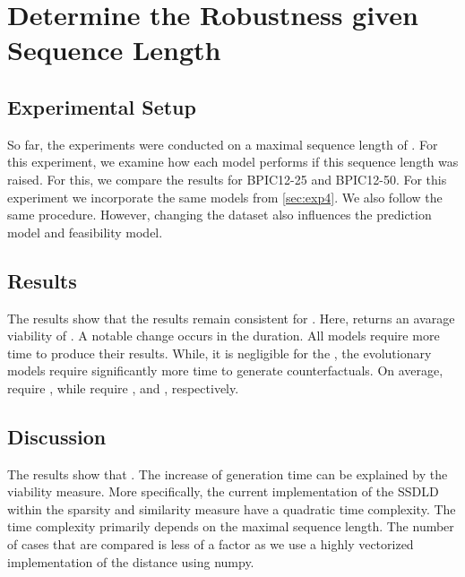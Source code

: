 \documentclass[./../../paper.tex]{subfiles}
\begin{document}
\section{Determine the Robustness given Sequence Length}

\subsection{Experimental Setup}
So far, the experiments were conducted on a maximal sequence length of . For this experiment, we examine how each model performs if this sequence length was raised. For this, we compare the results for BPIC12-25 and BPIC12-50. For this experiment we incorporate the same models from \autoref{sec:exp4}. We also follow the same procedure. However, changing the dataset also influences the prediction model and feasibility model.

\subsection{Results}
The results show that the results remain consistent for . Here,  returns an avarage viability of . 
A notable change occurs in the duration. All models require more time to produce their results. While, it is negligible for the , the evolutionary models require significantly more time to generate counterfactuals. On average,  require , while  require ,  and , respectively.

\subsection{Discussion}
The results show that . The increase of generation time can be explained by the viability measure. More specifically, the current implementation of the \gls{SSDLD} within the sparsity and similarity measure have a quadratic time complexity. The time complexity primarily depends on the maximal sequence length. The number of cases that are compared is less of a factor as we use a highly vectorized implementation of the distance using numpy.   
\end{document}
